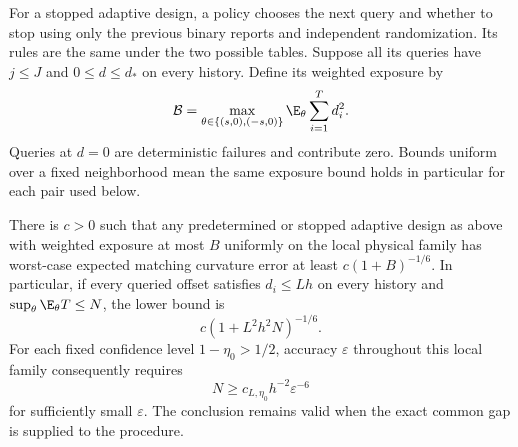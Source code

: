 For a stopped adaptive design, a policy chooses the next query and
whether to stop using only the previous binary reports and independent
randomization. Its rules are the same under the two possible tables.
Suppose all its queries have $j\le J$ and $0\le d\le d_*$ on every
history. Define its weighted exposure by
\[
 \mathcal B=\max_{\theta\in\{(s,0),(-s,0)\}}
                  \E_\theta\sum_{i=1}^{T}d_i^2.
\]
Queries at $d=0$ are deterministic failures and contribute zero.
Bounds uniform over a fixed neighborhood mean the same exposure bound
holds in particular for each pair used below.

\begin{theorem}\label{thm:v7-lower}
There is $c>0$ such that any predetermined or stopped adaptive design
as above with weighted exposure at most $B$ uniformly on the local
physical family has worst-case expected matching curvature error at
least $c(1+B)^{-1/6}$. In particular, if every queried offset satisfies
$d_i\le Lh$ on every history and
$\sup_\theta\E_\theta T\le N$, the lower bound is
\begin{equation}\label{eq:v7-risk-lower}
 c(1+L^2h^2N)^{-1/6}.
\end{equation}
For each fixed confidence level $1-\eta_0>1/2$, accuracy $\varepsilon$
throughout this local family consequently requires
\begin{equation}\label{eq:v7-cost-lower}
 N\ge c_{L,\eta_0}h^{-2}\varepsilon^{-6}
\end{equation}
for sufficiently small $\varepsilon$. The conclusion remains valid
when the exact common gap is supplied to the procedure.
\end{theorem}
